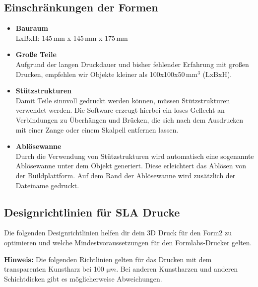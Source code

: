 \documentclass{\basedir/fablab-document}
\begin{document}
	\subsection{Einschränkungen der Formen}
	\begin{itemize}
		\item \textbf{Bauraum}\\LxBxH: 145\,mm x 145\,mm x 175\,mm
		\item \textbf{Große Teile}\\Aufgrund der langen Druckdauer und bisher fehlender Erfahrung mit großen Drucken, empfehlen wir Objekte kleiner als 100x100x50\,$\mathrm{mm}^3$ (LxBxH).
		\item \textbf{Stützstrukturen}\\Damit Teile sinnvoll gedruckt werden können, müssen Stützstrukturen verwendet werden. Die Software erzeugt hierbei ein loses Geflecht an Verbindungen zu Überhängen und Brücken, die sich nach dem Ausdrucken mit einer Zange oder einem Skalpell entfernen lassen.
		\item \textbf{Ablösewanne}\\Durch die Verwendung von Stützstrukturen wird automatisch eine sogenannte Ablösewanne unter dem Objekt generiert. Diese erleichtert das Ablösen von der Buildplattform. Auf dem Rand der Ablösewanne wird zusätzlich der Dateiname gedruckt.
	\end{itemize}

\subsection{Designrichtlinien für SLA Drucke}

Die folgenden Designrichtlinien helfen dir dein 3D Druck für den Form2 zu optimieren und welche Mindestvoraussetzungen für den Formlabs-Drucker gelten.

\textbf{Hinweis:} Die folgenden Richtlinien gelten für das Drucken mit dem transparenten Kunstharz bei 100 $\mathrm{\mu}m$. Bei anderen Kunstharzen und anderen Schichtdicken gibt es möglicherweise Abweichungen.
\end{document}
